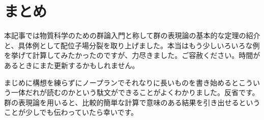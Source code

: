 \documentclass[uplatex,dvipdfmx,a4j]{jsarticle}
\begin{document}









\section{まとめ}
本記事では物質科学のための群論入門と称して群の表現論の基本的な定理の紹介と、具体例として配位子場分裂を取り上げました。本当はもう少しいろいろな例を挙げて計算してみたかったのですが、力尽きました。ご容赦ください。時間があるときにまた更新するかもしれません。

まじめに構想を練らずにノープランでそれなりに長いものを書き始めるとこういう一体だれが読むのかという駄文ができることがよくわかりました。反省です。群の表現論を用いると、比較的簡単な計算で意味のある結果を引き出せるということが少しでも伝わっていたら幸いです。
\end{document}

